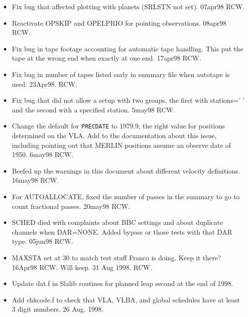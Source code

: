 \documentclass{report}
\begin{document}
\begin{itemize}

\item  Fix bug that affected plotting with planets (SRLSTN not set).
       07apr98 RCW.

\item  Reactivate OPSKIP and OPELPRIO for pointing observations.
       08apr98 RCW.

\item  Fix bug in tape footage accounting for automatic tape handling.
       This put the tape at the wrong end when exactly at one end.
       17apr98 RCW.

\item  Fix bug in number of tapes listed early in summary file when
       autotape is used.  23Apr98.  RCW.

\item  Fix bug that did not allow a setup with two groups, the first
       with stations=' ' and the second with a specified station.
       5may98 RCW.

\item  Change the default for {\tt PRECDATE} to 1979.9, the right
       value for positions determined on the VLA.  Add to the
       documentation about this issue, including pointing out that
       MERLIN positions assume an observe date of 1950.  6may98 RCW.

\item  Beefed up the warnings in this document about different velocity
       definitions.  16may98  RCW.

\item  For AUTOALLOCATE, fixed the number of passes in the summary to
       go to count fractional passes.  20may98 RCW.

\item  SCHED died with complaints about BBC settings and about duplicate
       channels when DAR=NONE.  Added bypass or those tests with that
       DAR type.  05jun98  RCW.

\item  MAXSTA set at 30 to match test stuff Franco is doing.  Keep
       it there?  16Apr98  RCW.  Will keep.  31 Aug 1998. RCW.

\item  Update dat.f in Slalib routines for planned leap second at the
       end of 1998.

\item  Add chkcode.f to check that VLA, VLBA, and global schedules have
       at least 3 digit numbers.  26 Aug. 1998.


\end{itemize}
\end{document}
